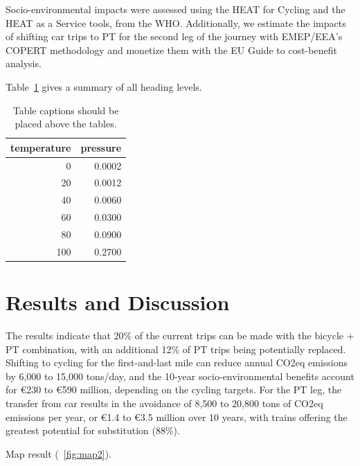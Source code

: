 \documentclass[runningheads]{llncs}
\begin{document}
Socio-environmental impacts were assessed using the HEAT for Cycling and
the HEAT as a Service tools, from the WHO. Additionally, we estimate the
impacts of shifting car trips to PT for the second leg of the journey
with EMEP/EEA's COPERT methodology and monetize them with the EU Guide
to cost-benefit analysis.

Table~\ref{tab:table} gives a summary of all heading levels.

\begin{table}

\caption{\label{tab:table}Table captions should be placed above the tables.}
\centering
\begin{tabular}[t]{r|r}
\hline
temperature & pressure\\
\hline
0 & 0.0002\\
\hline
20 & 0.0012\\
\hline
40 & 0.0060\\
\hline
60 & 0.0300\\
\hline
80 & 0.0900\\
\hline
100 & 0.2700\\
\hline
\end{tabular}
\end{table}

\hypertarget{results-and-discussion}{%
\section{Results and Discussion}\label{results-and-discussion}}

The results indicate that 20\% of the current trips can be made with the
bicycle + PT combination, with an additional 12\% of PT trips being
potentially replaced. Shifting to cycling for the first-and-last mile
can reduce annual CO2eq emissions by 6,000 to 15,000 tons/day, and the
10-year socio-environmental benefits account for €230 to €590 million,
depending on the cycling targets. For the PT leg, the transfer from car
results in the avoidance of 8,500 to 20,800 tons of CO2eq emissions per
year, or €1.4 to €3.5 million over 10 years, with trains offering the
greatest potential for substitution (88\%).

Map result (~\ref{fig:map2}).
\end{document}
